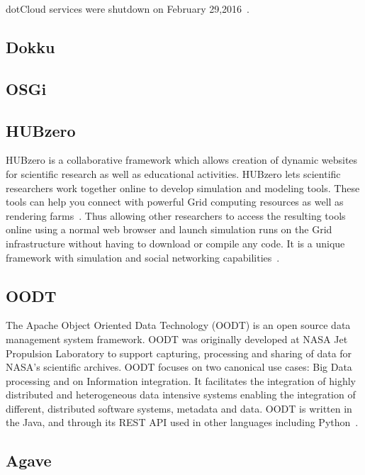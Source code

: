 dotCloud services were shutdown on February
29,2016~\cite{www-dotCloud}.

    \pv
    

\subsection{Dokku}

\pv 

\subsection{OSGi}

\pv 

\subsection{HUBzero}
     
HUBzero is a collaborative framework which allows creation of dynamic
websites for scientific research as well as educational activities.
HUBzero lets scientific researchers work together online to develop
simulation and modeling tools.  These tools can help you connect with
powerful Grid computing resources as well as rendering
farms~\cite{hubzerowebsite}. Thus allowing other researchers to access
the resulting tools online using a normal web browser and launch
simulation runs on the Grid infrastructure without having to download
or compile any code. It is a unique framework with simulation and
social networking capabilities~\cite{hubzeropaper2010}.

\subsection{OODT}
     
The Apache Object Oriented Data Technology (OODT) is an open source
data management system framework. OODT was originally developed at
NASA Jet Propulsion Laboratory to support capturing, processing and
sharing of data for NASA's scientific archives. OODT focuses on two
canonical use cases: Big Data processing and on Information
integration. It facilitates the integration of highly distributed and
heterogeneous data intensive systems enabling the integration of
different, distributed software systems, metadata and data. OODT is
written in the Java, and through its REST API used in other languages
including Python~\cite{www-oodt2}.
     
\subsection{Agave}

